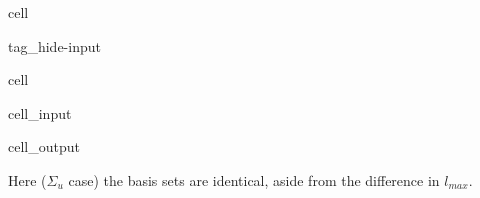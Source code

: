 \documentclass[letterpaper,table,10pt,english]{jupyterBook}
\begin{document}
\begin{sphinxuseclass}{cell}
\begin{sphinxuseclass}{tag_hide-input}
\end{sphinxuseclass}
\end{sphinxuseclass}
\begin{sphinxuseclass}{cell}\begin{sphinxVerbatimInput}

\begin{sphinxuseclass}{cell_input}
\begin{sphinxVerbatim}[commandchars=\\\{\}]
 
\end{sphinxVerbatim}

\end{sphinxuseclass}\end{sphinxVerbatimInput}
\begin{sphinxVerbatimOutput}

\begin{sphinxuseclass}{cell_output}
\end{sphinxuseclass}\end{sphinxVerbatimOutput}

\end{sphinxuseclass}
\sphinxAtStartPar
Here (\(\Sigma_u\) case) the basis sets are identical, aside from the difference in \(l_{max}\).
\end{document}
